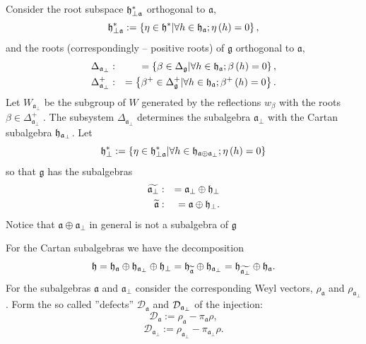 \documentclass[12pt]{article}
\theoremstyle{definition}
\newcommand{\gf}{\mathfrak{g}}
\newcommand{\af}{\mathfrak{a}}
\newcommand{\afb}{\mathfrak{a}_{\bot}}
\begin{document}
Consider the root subspace $\frak{h}_{\perp \af}^{\ast }$ orthogonal to
$\af$,
\begin{equation*}
\frak{h}_{\perp \af}^{\ast }:=\left\{ \eta \in \frak{h}^{\ast }|\forall
h\in \frak{h}_{\af};\eta \left( h\right) =0\right\} ,
\end{equation*}
and the roots (correspondingly -- positive roots) of $\gf$ orthogonal
to $\af$,
\begin{eqnarray}
\Delta _{\afb} &:&=\left\{ \beta \in \Delta _{\gf}|\forall
h\in \frak{h}_{\af};\beta \left( h\right) =0\right\} ,
\label{delta a ort} \\
\Delta _{\afb}^{+} &:&=\left\{ \beta ^{+}\in \Delta _{\gf%
}^{+}|\forall h\in \frak{h}_{\af};\beta ^{+}\left( h\right) =0\right\} .
\notag
\end{eqnarray}
Let $W_{\afb}$ be the subgroup of $W$ generated by the
reflections $w_{\beta }$ with the roots $\beta \in \Delta _{\afb}^{+}$ . The subsystem $\Delta _{\afb}$ determines the
subalgebra $\afb$ with the Cartan subalgebra $\frak{h}_{\af%
_{\perp }}$. Let
\begin{equation*}
\frak{h}_{\perp }^{\ast }:=\left\{ \eta \in \frak{h}_{\perp \af}^{\ast
}|\forall h\in \frak{h}_{\af\oplus \afb};\eta \left(
h\right) =0\right\}
\end{equation*}
so that $\gf$ has the subalgebras
\begin{eqnarray*}
\widetilde{\afb} &:&=\afb\oplus \frak{h}_{\perp }
\\
\widetilde{\af} &:&=\af\oplus \frak{h}_{\perp }.
\end{eqnarray*}
Notice that $\mathfrak{a} \oplus \mathfrak{a}_{\bot}$ in general is not a
subalgebra of $\mathfrak{g}$

For the Cartan subalgebras we have the decomposition
\begin{equation}
\frak{h}=\frak{\frak{h}_{\af}}\oplus \frak{h}_{\afb}\oplus
\frak{h}_{\perp }=\frak{\frak{h}_{\widetilde{\af}}}\oplus \frak{h}_{%
\afb}=\frak{\frak{h}_{\widetilde{\afb}}}\oplus
\frak{h}_{\af}.
\end{equation}
For the subalgebras $\af$ and $\afb$ consider the
corresponding Weyl vectors, $\rho _{\af}$ and $\rho _{\afb} $ . Form the so called ''defects'' $\mathcal{D}_{\af}$ and $\mathcal{%
D}_{\afb}$ of the injection:
\begin{equation}
\mathcal{D}_{\af}:=\rho _{\af}-\pi _{\af}\rho ,
\end{equation}
\begin{equation}
\mathcal{D}_{\afb}:=\rho _{\afb}-\pi _{\af%
_{\perp }}\rho .  \label{defect ort}
\end{equation}
\end{document}

